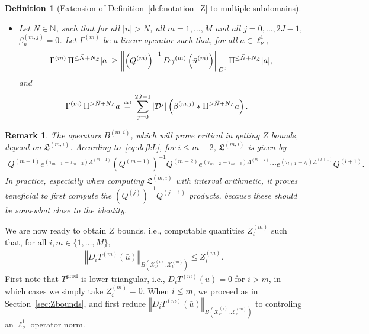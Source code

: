 \documentclass[10pt,a4paper]{article}
\theoremstyle{plain}
\newtheorem{remark}[theorem]{Remark}
\newtheorem{definition}[theorem]{Definition}
\newcommand{\NN}{\mathbb N}
\renewcommand{\L}{\mathcal{L}}
\newcommand{\D}{\mathcal{D}}
\newcommand{\X}{\mathcal{X}}
\newcommand{\bu}{\bar{u}}
\newcommand{\bN}{\bar{N}}
\newcommand{\kL}{\mathfrak{L}}
\newcommand{\1}{\mathbf{1}}
\newcommand{\pprod}{\mathrm{prod}}
\newcommand{\bydef}{\,\stackrel{\mbox{\tiny\textnormal{\raisebox{0ex}[0ex][0ex]{def}}}}{=}\,}
\newcommand{\NL}{N_{\text{\tiny{$\L$}}}}
\begin{document}
\begin{definition}[Extension of Definition~\ref{def:notation_Z} to multiple subdomains]
\begin{itemize}
\item Let $\bN\in\NN$, such that for all $\vert n\vert >\bN$, all $m=1,\ldots,M$ and all $j=0,\ldots,2J-1$, $\beta^{(m,j)}_n = 0$. Let $\Gamma^{(m)}$ be a linear operator such that, for all $a\in \ell^1_\nu$,
\begin{align*}
\Gamma^{(m)}\, \Pi^{\leq \bN + \NL} \vert a\vert \geq \left\Vert \left(Q^{(m)}\right)^{-1} D\gamma^{(m)}\left(\bu^{(m)}\right) \right\Vert_{C^0} \Pi^{\leq \bN + \NL} \vert a\vert,
\end{align*}
and
\begin{align*}
\Gamma^{(m)}\, \Pi^{> \bN + \NL}a &\bydef  \sum_{j=0}^{2J-1} \vert \D^j\vert \left( \beta^{(m,j)} \ast \Pi^{> \bN +\NL} a \right).
\end{align*}
\end{itemize}
\end{definition}
%
\begin{remark}
The operators $B^{(m,i)}$, which will prove critical in getting $Z$ bounds, depend on $\kL^{(m,i)}$. According to~\eqref{eq:defkL}, for $i\leq m-2$, $\kL^{(m,i)}$ is given by
\begin{align*}
 Q^{(m-1)}e^{(\tau_{m-1}-\tau_{m-2})\Lambda^{(m-1)}} \left(Q^{(m-1)}\right)^{-1}Q^{(m-2)}e^{(\tau_{m-2}-\tau_{m-3})\Lambda^{(m-2)}} \cdots e^{(\tau_{l+1}-\tau_{l})\Lambda^{(l+1)}}Q^{(l+1)}.
\end{align*}
In practice, especially when computing $\kL^{(m,i)}$ with interval arithmetic, it proves beneficial to first compute the $  
\left(Q^{(j)}\right)^{-1}Q^{(j-1)}$ products, because these should be somewhat close to the identity. 
\end{remark}
%

We are now ready to obtain $Z$ bounds, i.e., computable quantities $Z^{(m)}_i$ such that, for all $i,m\in\{1,\ldots,M\}$,
\begin{align*}
\left\Vert D_i T^{(m)}(\bu)\right\Vert_{B(\X_\nu^{(i)},\X_\nu^{(m)})} \leq Z^{(m)}_i.
\end{align*}
First note that $T^{\pprod}$ is lower triangular, i.e., $D_i T^{(m)}(\bu)=0$ for $i>m$, in which cases we simply take $Z^{(m)}_i=0$. When $i\leq m$, we proceed as in Section~\ref{sec:Zbounds}, and first reduce $\left\Vert D_i T^{(m)}(\bu)\right\Vert_{B(\X_\nu^{(i)},\X_\nu^{(m)})}$ to controling an $\ell^1_\nu$ operator norm.
\end{document}
